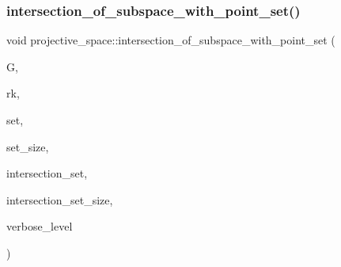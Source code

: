 \subsubsection{\texorpdfstring{intersection\+\_\+of\+\_\+subspace\+\_\+with\+\_\+point\+\_\+set()}{intersection\_of\_subspace\_with\_point\_set()}}
{\footnotesize\ttfamily void projective\+\_\+space\+::intersection\+\_\+of\+\_\+subspace\+\_\+with\+\_\+point\+\_\+set (\begin{DoxyParamCaption}\item[{\mbox{\hyperlink{classgrassmann}{grassmann}} $\ast$}]{G,  }\item[{\mbox{\hyperlink{galois_8h_a09fddde158a3a20bd2dcadb609de11dc}{I\+NT}}}]{rk,  }\item[{\mbox{\hyperlink{galois_8h_a09fddde158a3a20bd2dcadb609de11dc}{I\+NT}} $\ast$}]{set,  }\item[{\mbox{\hyperlink{galois_8h_a09fddde158a3a20bd2dcadb609de11dc}{I\+NT}}}]{set\+\_\+size,  }\item[{\mbox{\hyperlink{galois_8h_a09fddde158a3a20bd2dcadb609de11dc}{I\+NT}} $\ast$\&}]{intersection\+\_\+set,  }\item[{\mbox{\hyperlink{galois_8h_a09fddde158a3a20bd2dcadb609de11dc}{I\+NT}} \&}]{intersection\+\_\+set\+\_\+size,  }\item[{\mbox{\hyperlink{galois_8h_a09fddde158a3a20bd2dcadb609de11dc}{I\+NT}}}]{verbose\+\_\+level }\end{DoxyParamCaption})}

\mbox{\label{classprojective__space_afd482c5fb30b0367fe9b0463dc085282}} 
